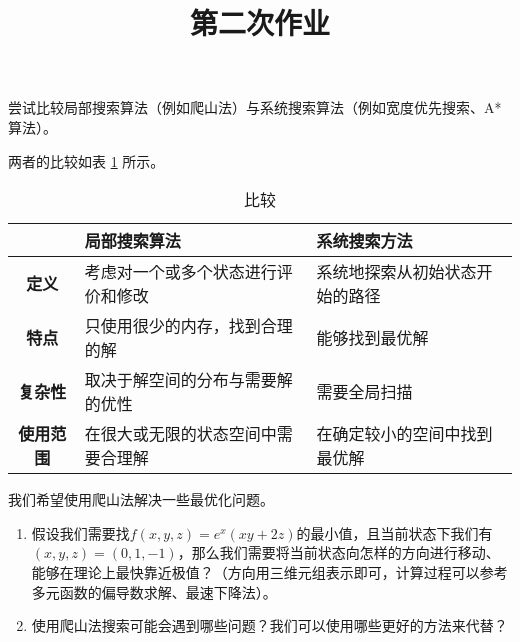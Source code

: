 \endofdump
{}

    \title{第二次作业}
    \maketitle
    
    \begin{problem}
        尝试比较局部搜索算法（例如爬山法）与系统搜索算法（例如宽度优先搜索、A*算法）。
    \end{problem}

    \begin{solution}
        两者的比较如表 \ref{tab:compare} 所示。
        \begin{table}[H]
            \centering
            \caption{比较}\label{tab:compare}
            \begin{tabular}{>{\bfseries}cp{7.3cm}p{7.3cm}}
                \toprule
                    & \bfseries 局部搜索算法 & \bfseries 系统搜索方法 \\
                \midrule
                定义 & 考虑对一个或多个状态进行评价和修改 & 系统地探索从初始状态开始的路径 \\
                特点 & 只使用很少的内存，找到合理的解 & 能够找到最优解 \\
                复杂性 & 取决于解空间的分布与需要解的优性 & 需要全局扫描 \\
                使用范围 & 在很大或无限的状态空间中需要合理解 & 在确定较小的空间中找到最优解 \\
                \bottomrule
            \end{tabular}
        \end{table}
    \end{solution}

    \begin{problem}
        我们希望使用爬山法解决一些最优化问题。
        \begin{enumerate}
            \item 假设我们需要找$f(x,y,z) = e^x(xy+2z)$的最小值，且当前状态下我们有$(x,y,z) = (0,1,-1)$，那么我们需要将当前状态向怎样的方向进行移动、能够在理论上最快靠近极值？（方向用三维元组表示即可，计算过程可以参考多元函数的偏导数求解、最速下降法）。
            \item 使用爬山法搜索可能会遇到哪些问题？我们可以使用哪些更好的方法来代替？
        \end{enumerate}
    \end{problem}

